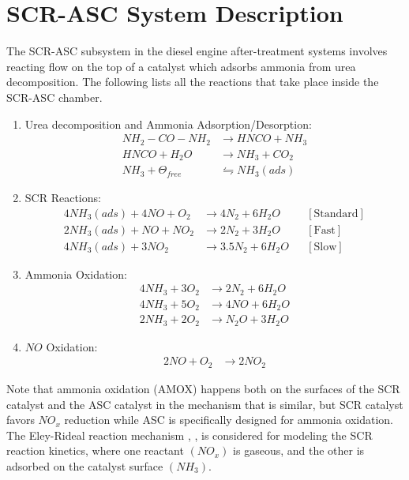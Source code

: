 \section{SCR-ASC System Description}

The SCR-ASC subsystem in the diesel engine after-treatment systems involves reacting flow on the top of a catalyst which adsorbs ammonia from urea decomposition. The following lists all the reactions \cite{nova2014urea} that take place inside the SCR-ASC chamber.

\begin{enumerate}
    \item Urea decomposition and Ammonia Adsorption/Desorption:
    \begin{align*}
        NH_2 - CO - NH_2 &\longrightarrow  HNCO + NH_3 \\
        HNCO + H_2O &\longrightarrow NH_3 + CO_2 \\
        NH_3 + \Theta_{free} &\leftrightharpoons NH_3(ads)
    \end{align*}

    \item SCR Reactions:
    \begin{align*}
    4 NH_3 (ads) + 4 NO + O_2 &\longrightarrow 4 N_2 + 6 H_2O
                              & &[\text{Standard}]\\
    2 NH_3 (ads) +  NO + N O_2 &\longrightarrow 2 N_2 + 3 H_2O
                              & &[\text{Fast}]\\
    4 NH_3 (ads) + 3N O_2 &\longrightarrow 3.5 N_2 + 6 H_2O
                              & &[\text{Slow}]
    \end{align*}

    \item Ammonia Oxidation:
    \begin{align*}
    4 NH_3 + 3 O_2 &\longrightarrow 2 N_2 + 6 H_2O\\
    4 NH_3 + 5 O_2 &\longrightarrow 4 NO + 6 H_2 O\\
    2 NH_3 + 2 O_2 &\longrightarrow N_2O + 3 H_2O
    \end{align*}

    \item $NO$ Oxidation:
    \begin{align*}
    2 NO + O_2 &\longrightarrow 2 NO_2
    \end{align*}
\end{enumerate}

Note that ammonia oxidation (AMOX) happens both on the surfaces of the SCR catalyst and the ASC catalyst in the
mechanism that is similar, but SCR catalyst favors $NO_x$ reduction while ASC is specifically designed for ammonia
oxidation. The Eley-Rideal reaction mechanism \cite{yuan2015diesel}, \cite{hsieh2011development}, \cite{nova2014urea} is
considered for modeling the SCR reaction kinetics, where one reactant $(NO_x)$ is gaseous, and the other is adsorbed on
the catalyst surface $(NH_3)$.

